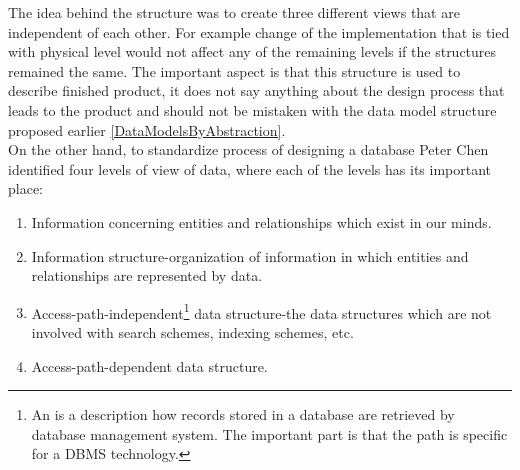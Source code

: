 The idea behind the structure was to create three different views that are independent of each other. 
For example change of the implementation that is tied with physical level would not affect any of the remaining levels if the structures remained the same. 
The important aspect is that this structure is used to describe finished product, it does not say anything about the design process that leads to the product and should not be mistaken with the data model structure proposed earlier \ref{DataModelsByAbstraction}.\\

On the other hand, to standardize process of designing a database Peter Chen\cite{Chen76theentity-relationship} identified four levels of view of data, where each of the levels has its important place: \\
\begin{enumerate}
	\item Information concerning entities and relationships which exist in our minds.
	\item Information structure-organization of information in which entities and relationships are represented by data.
	\item Access-path-independent\footnote{An  is a description how records stored in a database are retrieved by database management system\cite{AccessPathDefiniton}. The important part is that the path is specific for a DBMS technology.} data structure-the data structures which are not involved with search schemes, indexing schemes, etc.
	\item Access-path-dependent data structure.
\end{enumerate}

